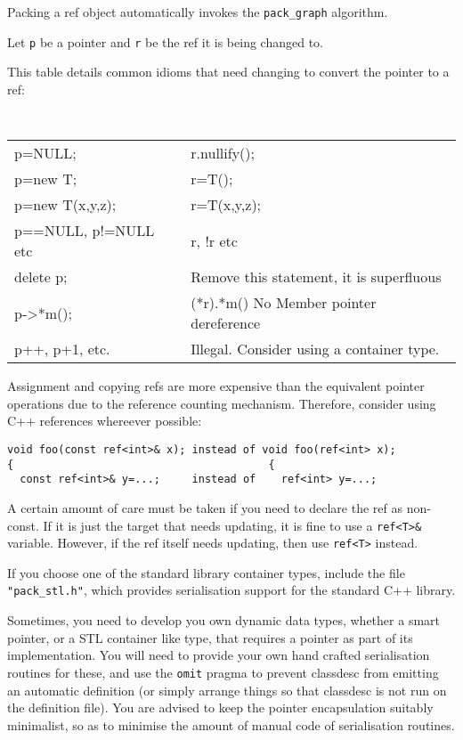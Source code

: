 Packing a ref object automatically invokes the \verb+pack_graph+ algorithm.


Let {\tt p} be a pointer and {\tt r} be the ref it is being changed
to.

This table details common idioms that need changing to convert the
pointer to a ref:

\vspace{1ex}
{\tt
\begin{tabular}{ll}
\hline
p=NULL; & r.nullify();\\
p=new T; & r=T();\\
p=new T(x,y,z); & r=T(x,y,z);\\
p==NULL, p!=NULL etc & r, !r etc\\
delete p; & Remove this statement, it is superfluous\\ 
p->*m(); & (*r).*m() No Member pointer dereference\\
p++, p+1, etc. & Illegal. Consider using a container type.\\
\hline
\end{tabular}
}
\vspace{1ex}

Assignment and copying refs are more expensive than the equivalent
pointer operations due to the reference counting mechanism. Therefore,
consider using C++ references whereever possible:

\begin{verbatim}
void foo(const ref<int>& x); instead of void foo(ref<int> x);
{                                        {
  const ref<int>& y=...;     instead of    ref<int> y=...;
\end{verbatim}

A certain amount of care must be taken if you need to declare the
ref as non-const. If it is just the target that needs updating,
it is fine to use a \verb+ref<T>&+ variable. However, if the ref
itself needs updating, then use \verb+ref<T>+ instead.


If you choose one of the standard library container types, include the
file \verb+"pack_stl.h"+, which provides
serialisation support for the standard C++
library.


Sometimes, you need to develop you own dynamic data types, whether a
smart pointer, or a STL container like type, that requires a pointer
as part of its implementation. You will need to provide your own hand
crafted serialisation routines for these, and use the {\tt omit}
pragma to prevent classdesc from emitting an
automatic definition (or simply arrange things so that classdesc is
not run on the definition file). You are advised to keep the pointer
encapsulation suitably minimalist, so as to minimise the amount of
manual code of serialisation routines.

